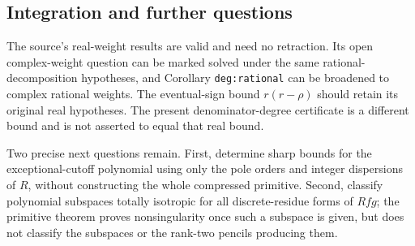 \subsection{Integration and further questions}

The source's real-weight results are valid and need no retraction.
Its open complex-weight question can be marked solved under the
same rational-decomposition hypotheses, and Corollary
\texttt{deg:rational} can be broadened to complex rational weights.
The eventual-sign bound $r(r-\rho)$ should retain its original real
hypotheses.  The present denominator-degree certificate is a
different bound and is not asserted to equal that real bound.

Two precise next questions remain.  First, determine sharp bounds
for the exceptional-cutoff polynomial using only the pole orders and
integer dispersions of $R$, without constructing the whole compressed
primitive.  Second, classify polynomial subspaces totally isotropic
for all discrete-residue forms of $Rfg$; the primitive theorem proves
nonsingularity once such a subspace is given, but does not classify
the subspaces or the rank-two pencils producing them.

